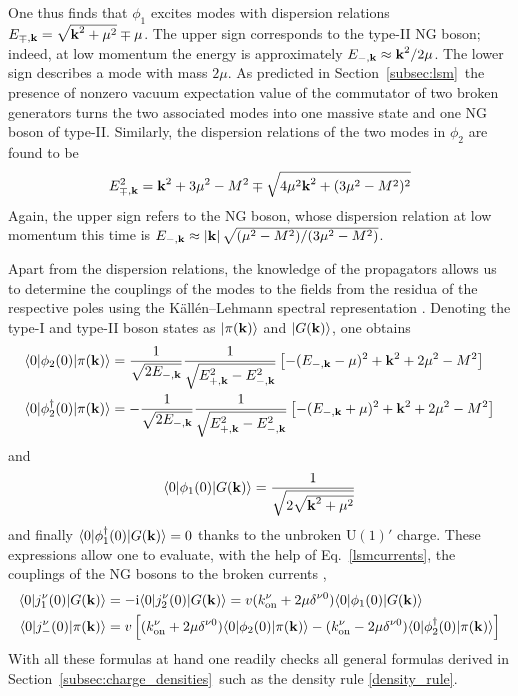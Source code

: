 \documentclass[final,2p,times,12pt,sort&compress]{elsarticle}
\newcommand\gr[1]{\mathrm{#1}}              %
\newcommand\vek[1]{{\boldsymbol{\bf #1}}}   %
\newcommand\bra[1]{\langle#1\vert}          %
\newcommand\ket[1]{\vert#1\rangle}          %
\newcommand\he[1]{#1^{\dagger}}             %
\newcommand\imag{\mathrm i}                 %
\newcommand\abs[1]{\left|#1\right|}         %
\begin{document}
One thus finds that $\phi_1$ excites modes with dispersion relations
$E_{\mp,\vek k}=\sqrt{\vek k^2+\mu^2}\mp\mu$. The upper sign corresponds to the
type-II NG boson; indeed, at low momentum the energy is approximately $E_{-,\vek
k}\approx\vek k^2/2\mu$. The lower sign describes a mode with mass $2\mu$. As
predicted in Section~\ref{subsec:lsm}\ the presence of nonzero vacuum
expectation value of the commutator of two broken generators turns the two
associated modes into one massive state and one NG boson of type-II. Similarly,
the dispersion relations of the two modes in $\phi_2$ are found to be
\begin{equation}
E^2_{\mp,\vek k}=\vek k^2+3\mu^2-M^2\mp\sqrt{4\mu^2\vek k^2+(3\mu^2-M^2)^2}
\end{equation}
Again, the upper sign refers to the NG boson, whose dispersion relation at low
momentum this time is $E_{-,\vek k}\approx\abs{\vek
k}\sqrt{(\mu^2-M^2)/(3\mu^2-M^2)}$.

Apart from the dispersion relations, the knowledge of the propagators allows us
to determine the couplings of the modes to the fields from the residua of the
respective poles using the K\"all\'en--Lehmann spectral representation
\cite{Brauner:2006xm}. Denoting the type-I and type-II boson states as
$\ket{\pi(\vek k)}$ and $\ket{G(\vek k)}$, one obtains
\begin{equation}
\begin{split}
\bra0\phi_2(0)\ket{\pi(\vek k)}&=\frac1{\sqrt{2E_{-,\vek k}}}
\frac1{\sqrt{E_{+,\vek k}^2-E_{-,\vek k}^2}}
\left[-(E_{-,\vek k}-\mu)^2+\vek k^2+2\mu^2-M^2\right]\\
\bra0\he\phi_2(0)\ket{\pi(\vek k)}&=-\frac1{\sqrt{2E_{-,\vek k}}}
\frac1{\sqrt{E_{+,\vek k}^2-E_{-,\vek k}^2}}
\left[-(E_{-,\vek k}+\mu)^2+\vek k^2+2\mu^2-M^2\right]
\end{split}
\end{equation}
and
\begin{equation}
\bra0\phi_1(0)\ket{G(\vek k)}=\frac1{\sqrt{2\sqrt{\vek k^2+\mu^2}}}
\end{equation}
and finally $\bra0\he\phi_1(0)\ket{G(\vek k)}=0$ thanks to the unbroken
$\gr{U(1)}'$ charge. These expressions allow one to evaluate, with the
help of Eq.~\eqref{lsmcurrents}, the couplings of the NG bosons to the broken
currents \cite{Brauner:2007uw},
\begin{equation}
\begin{split}
\bra0j_1^\nu(0)\ket{G(\vek k)}&=-\imag\bra0j_2^\nu(0)\ket{G(\vek k)}=
v(k^\nu_{\text{on}}+2\mu\delta^{\nu0})\bra0\phi_1(0)\ket{G(\vek k)}\\
\bra0j_-^\nu(0)\ket{\pi(\vek k)}&=v\left[(k^\nu_{\text{on}}+2\mu\delta^{\nu0})
\bra0\phi_2(0)\ket{\pi(\vek k)}-(k^\nu_{\text{on}}-2\mu\delta^{\nu0})
\bra0\he\phi_2(0)\ket{\pi(\vek k)}\right]
\end{split}
\end{equation}
With all these formulas at hand one readily checks all general formulas derived
in Section~\ref{subsec:charge_densities}\ such as the density rule
\eqref{density_rule}.
\end{document}
